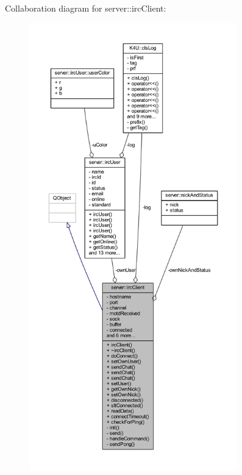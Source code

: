 Collaboration diagram for server\-:\-:irc\-Client\-:\nopagebreak
\begin{figure}[H]
\begin{center}
\leavevmode
\includegraphics[height=550pt]{d4/d1c/classserver_1_1irc_client__coll__graph}
\end{center}
\end{figure}
